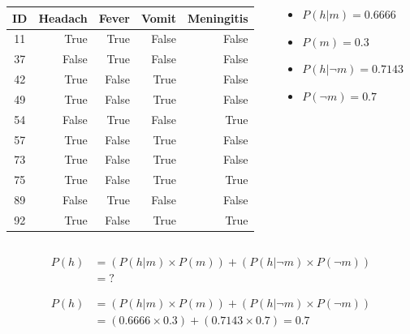 \documentclass[xcolor={table}]{beamer}
\begin{document}
\begin{frame}
\begin{columns}
\begin{column}{0.6\textwidth}
\begin{footnotesize}
\begin{tabular}{crrrr}
\hline
\textbf{ID} & \textbf{Headach} & \textbf{Fever} & \textbf{Vomit} & \textbf{Meningitis}\\
\hline
11 & True & True & False & False\\
37 & False & True & False & False\\
42 & True & False & True & False\\
49 & True & False & True & False\\
54 & False & True & False & True\\
57 & True & False & True & False\\
73 & True & False & True & False\\
75 & True & False & True & True\\
89 & False & True & False & False\\
92 & True & False & True & True\\
\hline
\end{tabular}
\end{footnotesize}
\end{column}
\begin{column}{0.4\textwidth}
	\begin{itemize}
		\item $P(h|m) = 0.6666$
		\item $P(m) = 0.3$
		\item $P(h|\lnot m) = 0.7143$
		\item $P(\lnot m) = 0.7$
	\end{itemize}
\end{column}
\end{columns}
\end{frame} 

 \begin{frame} 
\begin{alignat*}{2}
P(h) &= \left( P(h|m) \times P(m) \right) + \left( P(h|\lnot m) \times P(\lnot m) \right)\\
&= ?
\end{alignat*}
\end{frame} 

 \begin{frame} 
\begin{alignat*}{2}
P(h) &= \left( P(h|m) \times P(m) \right) + \left( P(h|\lnot m) \times P(\lnot m) \right)\\
&= \left( 0.6666 \times 0.3 \right) + \left( 0.7143 \times 0.7 \right) = 0.7
\end{alignat*}
\end{frame} 
\end{document}

